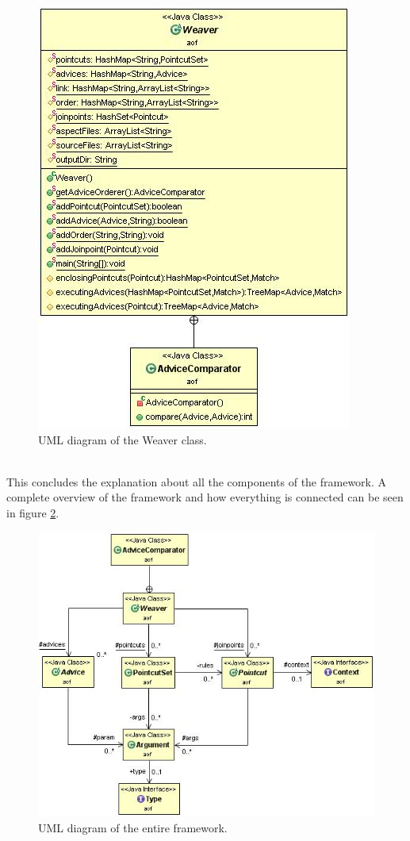 \documentclass[a4paper]{report}
\begin{document}
\begin{figure}[h!]
\centering
\includegraphics[scale=0.7]{images/AOF/Weaver.jpg}
\caption{UML diagram of the Weaver class.}
\label{fig:Weaver}
\end{figure}
\\
This concludes the explanation about all the components of the framework. A complete overview of the framework and how everything is connected can be seen in figure \ref{fig:FullView}.\\
\begin{figure}
\centering
\includegraphics[scale=0.65]{images/AOF/Full.jpg}
\caption{UML diagram of the entire framework.}
\label{fig:FullView}
\end{figure}
\end{document}
